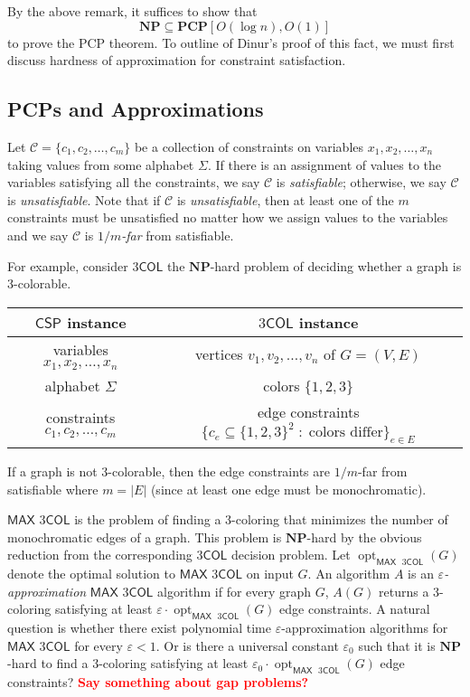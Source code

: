 \documentclass{article}
\newcommand{\fixme}[1] { \textcolor{red} {
{\fbox{ {\bf Fix:} \ensuremath{\blacktriangleright }} {\bf #1}
\fbox{\ensuremath{\blacktriangleleft} } } } }
\newcommand{\class}[1]{\mathbf{#1}}
\newcommand{\NP}{\class{NP}}
\newcommand{\PCP}{\class{PCP}}
\newcommand{\CSP}{\mathsf{CSP}}
\newcommand{\COL}{\mathsf{COL}}
\newcommand{\MAX}{\mathsf{MAX}}
\newcommand{\opt}{{\operatorname{opt}}}
\begin{document}
By the above remark, it suffices to show that
$$
\NP \subseteq \PCP[O(\log n), O(1)]
$$
to prove the PCP theorem.
To outline of Dinur's proof of this fact, we must first
discuss hardness of approximation for constraint satisfaction.

\subsection{PCPs and Approximations}


Let $\mathcal{C} = \{c_1, c_2, \dots, c_m\}$ be a collection of constraints on
variables $x_1, x_2, \dots, x_n$ taking values from some alphabet $\Sigma$.
If there is an assignment of values to the variables satisfying all the
constraints, we say $\mathcal{C}$ is \emph{satisfiable}; otherwise, we say
$\mathcal{C}$ is \emph{unsatisfiable}.
Note that if $\mathcal{C}$ is \emph{unsatisfiable}, then at least one of the
$m$ constraints must be unsatisfied no matter how we assign values to the
variables and we say $\mathcal{C}$ is \emph{$1/m$-far} from satisfiable. 

For example, consider $3\COL$ the $\NP$-hard problem of deciding whether a graph is 3-colorable.
\begin{center}
\begin{tabular}{c @{$\quad\longleftrightarrow\quad$} c}
$\CSP$ instance & $3\COL$ instance\\
\hline
variables $x_1, x_2, \dots, x_n$ & vertices $v_1, v_2, \dots, v_n$ of $G = (V, E)$\\
alphabet $\Sigma$ & colors $\{1, 2, 3\}$ \\
constraints $c_1, c_2, \dots, c_m$ & edge constraints $\{c_e \subseteq \{1, 2, 3\}^2 \;:\;\text{colors differ}\}_{e \in E}$\\
\end{tabular}
\end{center}
If a graph is not 3-colorable, then the edge constraints are $1/m$-far from satisfiable
where $m=|E|$ (since at least one edge must be monochromatic).

$\MAX$ $3\COL$ is the problem of finding a 3-coloring that minimizes the
number of monochromatic edges of a graph.
This problem is $\NP$-hard by the obvious reduction from the corresponding
$3\COL$ decision problem.
Let $\opt_{\MAX\text{ }3\COL}(G)$ denote the optimal solution to $\MAX$ $3\COL$
on input $G$.
An algorithm $A$ is an \emph{$\varepsilon$-approximation} $\MAX$ $3\COL$ algorithm
if for every graph $G$, $A(G)$ returns a 3-coloring
satisfying at least $\varepsilon \cdot \opt_{\MAX\text{ }3\COL}(G)$
edge constraints.
A natural question is whether there exist polynomial time $\varepsilon$-approximation
algorithms for $\MAX$ $3\COL$ for every $\varepsilon<1$.
Or is there a universal constant $\varepsilon_0$ such that it is
$\NP$-hard to find a 3-coloring satisfying at least $\varepsilon_0 \cdot \opt_{\MAX\text{ }3\COL}(G)$
edge constraints?
\fixme{Say something about gap problems?}
\end{document}
